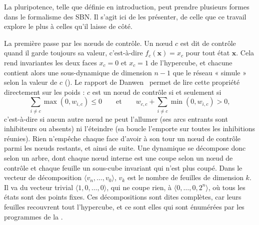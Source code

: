 \documentclass[12pt, a4paper]{article}
\begin{document}
La pluripotence, telle que définie en introduction, peut prendre plusieurs formes dans le formalisme des SBN.
Il s'agit ici de les présenter, de celle que ce travail explore le plus à celles qu'il laisse de côté.

La première passe par les nœuds de contrôle.
Un nœud $c$ est dit de contrôle quand il garde toujours sa valeur, c'est-à-dire $f_c(\mathbf{x}) = x_c$ pour tout état $\mathbf{x}$.
Cela rend invariantes les deux faces $x_c = 0$ et $x_c = 1$ de l'hypercube, et chacune contient alors une sous-dynamique de dimension $n-1$ que le réseau « simule » selon la valeur de $c$ ().
Le rapport de Danwen~\cite{wu2024} permet de lire cette propriété directement sur les poids : $c$ est un nœud de contrôle si et seulement si
\begin{equation}
\sum_{i \neq c} \max(0, w_{i,c}) \le 0
\qquad \text{et} \qquad
w_{c,c} + \sum_{i \neq c} \min(0, w_{i,c}) > 0 ,
\end{equation}
c'est-à-dire si aucun autre nœud ne peut l'allumer (ses arcs entrants sont inhibiteurs ou absents) ni l'éteindre (sa boucle l'emporte sur toutes les inhibitions réunies).
Rien n'empêche chaque face d'avoir à son tour un nœud de contrôle parmi les nœuds restants, et ainsi de suite.
Une dynamique se décompose donc selon un arbre, dont chaque nœud interne est une coupe selon un nœud de contrôle et chaque feuille un sous-cube invariant qui n'est plus coupé.
Dans le vecteur de décomposition $\langle v_n, \dots, v_0 \rangle$, $v_k$ est le nombre de feuilles de dimension $k$.
Il va du vecteur trivial $\langle 1, 0, \dots, 0 \rangle$, qui ne coupe rien, à $\langle 0, \dots, 0, 2^n \rangle$, où tous les états sont des points fixes.
Ces décompositions sont dites complètes, car leurs feuilles recouvrent tout l'hypercube, et ce sont elles qui sont énumérées par les programmes de la .
\end{document}
